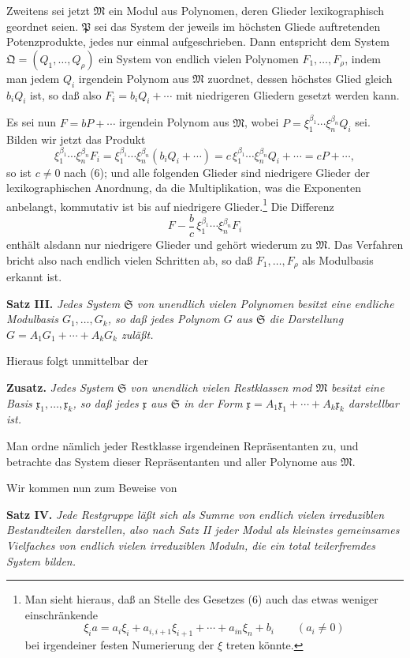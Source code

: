 \documentclass[11pt]{article}
\newcommand{\mM}{\mathfrak{M}}
\newcommand{\mx}{\mathfrak{x}}
\providecommand{\mP}{\mathfrak{P}}
\providecommand{\mQ}{\mathfrak{Q}}
\providecommand{\mS}{\mathfrak{S}}
\begin{document}
Zweitens sei jetzt $\mM$ ein Modul aus Polynomen, deren Glieder lexikographisch geordnet seien. $\mP$ sei das System der jeweils im höchsten Gliede auftretenden Potenzprodukte, jedes nur einmal aufgeschrieben. Dann entspricht dem System $\mQ=(Q_1,\ldots,Q_\rho)$ ein System von endlich vielen Polynomen $F_1,\ldots,F_\rho$, indem man jedem $Q_i$ irgendein Polynom aus $\mM$ zuordnet, dessen höchstes Glied gleich $b_iQ_i$ ist, so daß also $F_i=b_iQ_i+\cdots$ mit niedrigeren Gliedern gesetzt werden kann.

Es sei nun $F=bP+\cdots$ irgendein Polynom aus $\mM$, wobei $P=\xi_1^{\beta_1}\cdots\xi_n^{\beta_n}Q_i$ sei. Bilden wir jetzt das Produkt
\[
 \xi_1^{\beta_1}\cdots\xi_n^{\beta_n}F_i
 =\xi_1^{\beta_1}\cdots\xi_n^{\beta_n}(b_iQ_i+\cdots)
 =c\,\xi_1^{\beta_1}\cdots\xi_n^{\beta_n}Q_i+\cdots
 =cP+\cdots,
\]
so ist $c\ne0$ nach (6); und alle folgenden Glieder sind niedrigere Glieder der lexikographischen Anordnung, da die Multiplikation, was die Exponenten anbelangt, kommutativ ist bis auf niedrigere Glieder.\footnote{Man sieht hieraus, daß an Stelle des Gesetzes (6) auch das etwas weniger einschränkende
\[
 \xi_i a=a_i\xi_i+a_{i,i+1}\xi_{i+1}+\cdots+a_{in}\xi_n+b_i\qquad(a_i\ne0)
\]
bei irgendeiner festen Numerierung der $\xi$ treten könnte.} Die Differenz
\[
 F-\frac bc\,\xi_1^{\beta_1}\cdots\xi_n^{\beta_n}F_i
\]
enthält alsdann nur niedrigere Glieder und gehört wiederum zu $\mM$. Das Verfahren bricht also nach endlich vielen Schritten ab, so daß $F_1,\ldots,F_\rho$ als Modulbasis erkannt ist.

\textbf{Satz III.} \emph{Jedes System $\mS$ von unendlich vielen Polynomen besitzt eine endliche Modulbasis $G_1,\ldots,G_k$, so daß jedes Polynom $G$ aus $\mS$ die Darstellung $G=A_1G_1+\cdots+A_kG_k$ zuläßt.}

Hieraus folgt unmittelbar der

\textbf{Zusatz.} \emph{Jedes System $\mS$ von unendlich vielen Restklassen mod $\mM$ besitzt eine Basis $\mx_1,\ldots,\mx_k$, so daß jedes $\mx$ aus $\mS$ in der Form $\mx=A_1\mx_1+
\cdots+A_k\mx_k$ darstellbar ist.}

Man ordne nämlich jeder Restklasse irgendeinen Repräsentanten zu, und betrachte das System dieser Repräsentanten und aller Polynome aus $\mM$.

Wir kommen nun zum Beweise von

\textbf{Satz IV.} \emph{Jede Restgruppe läßt sich als Summe von endlich vielen irreduziblen Bestandteilen darstellen, also nach Satz II jeder Modul als kleinstes gemeinsames Vielfaches von endlich vielen irreduziblen Moduln, die ein total teilerfremdes System bilden.}
\end{document}
